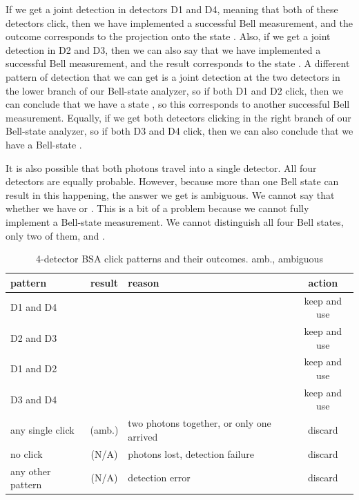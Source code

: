 If we get a joint detection in detectors D1 and D4, meaning that both of these detectors click, then we have implemented a successful Bell measurement, and the outcome corresponds to the projection onto the state \ket{\Psi^-}. Also, if we get a joint detection in D2 and D3, then we can also say that we have implemented a successful Bell measurement, and the result corresponds to the state \ket{\Psi^-}. A different pattern of detection that we can get is a joint detection at the two detectors in the lower branch of our Bell-state analyzer, so if both D1 and D2 click, then we can conclude that we have a state \ket{\Psi^+}, so this corresponds to another successful Bell measurement. Equally, if we get both detectors clicking in the right branch of our Bell-state analyzer, so if both D3 and D4 click, then we can also conclude that we have a Bell-state \ket{\Psi^+}.

It is also possible that both photons travel into a single detector. All four detectors are equally probable. However, because more than one Bell state can result in this happening, the answer we get is ambiguous. We cannot say that whether we have \ket{\Phi^+} or \ket{\Phi^-}.
This is a bit of a problem because we cannot fully implement a Bell-state measurement. We cannot distinguish all four Bell states, only two of them, \ket{\Psi^+} and \ket{\Psi^-}.

\begin{table}
\centering
\begin{tabular}{p{0.55in}|c|p{1.5in}|c}
pattern  & result & reason & action \\\hline
D1 and D4 & \ket{\Psi^-} & & keep and use \\
D2 and D3 & \ket{\Psi^-} & & keep and use \\
D1 and D2 & \ket{\Psi^+} & & keep and use \\
D3 and D4 & \ket{\Psi^+} & & keep and use \\
any single click & \ket{\Phi^\pm} (amb.)  & two photons together, or only one arrived & discard \\
no click & (N/A) & photons lost, detection failure & discard \\
any other pattern & (N/A) & detection error & discard
\end{tabular}
\caption{4-detector BSA click patterns and their outcomes. amb., ambiguous}
\label{tab:bsa-clicks}
\end{table}

